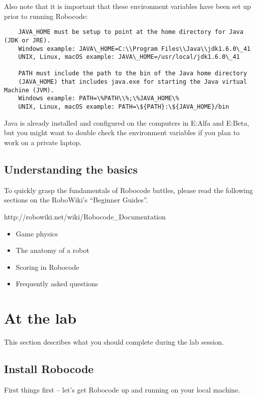 \documentclass{scrreprt}
\begin{document}
Also note that it is important that these environment variables have been set up prior to running Robocode:

\begin{verbatim}
    JAVA_HOME must be setup to point at the home directory for Java (JDK or JRE).
    Windows example: JAVA\_HOME=C:\\Program Files\\Java\\jdk1.6.0\_41
    UNIX, Linux, macOS example: JAVA\_HOME=/usr/local/jdk1.6.0\_41

    PATH must include the path to the bin of the Java home directory
    (JAVA_HOME) that includes java.exe for starting the Java virtual Machine (JVM).
    Windows example: PATH=\%PATH\\%;\%JAVA_HOME\%
    UNIX, Linux, macOS example: PATH=\${PATH}:\${JAVA_HOME}/bin
\end{verbatim}

Java is already installed and configured on the computers in E:Alfa and E:Beta, but you might want to double check the environment variables if you plan to work on a private laptop.

\section{Understanding the basics}
To quickly grasp the fundamentals of Robocode battles, please read the following sections on the RoboWiki's ``Beginner Guides''. 

http://robowiki.net/wiki/Robocode\_Documentation
\begin{itemize}
\item Game physics
\item The anatomy of a robot
\item Scoring in Robocode
\item Frequently asked questions
\end{itemize}

\chapter{At the lab}
This section describes what you should complete during the lab session.

\section{Install Robocode} \label{sec:install}
First things first -- let's get Robocode up and running on your local machine.
\end{document}
